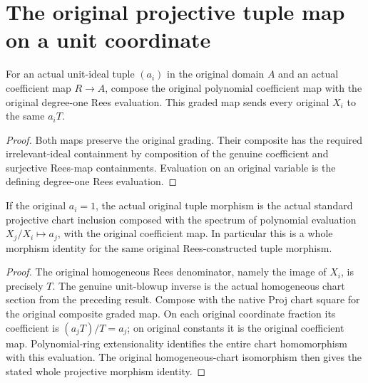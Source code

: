\section{The original projective tuple map on a unit coordinate}

\begin{definition}
\label{def:fc-generated-tuple-graded-map}
\leanok
{}
For an actual unit-ideal tuple $(a_i)$ in the original domain $A$ and
an actual coefficient map $R\to A$, compose the original polynomial
coefficient map with the original degree-one Rees evaluation. This
graded map sends every original $X_i$ to the same $a_iT$.
\end{definition}
\begin{proof}
Both maps preserve the original grading. Their composite has the
required irrelevant-ideal containment by composition of the genuine
coefficient and surjective Rees-map containments. Evaluation on an
original variable is the defining degree-one Rees evaluation.
\end{proof}

\begin{theorem}
\label{thm:fc-generated-tuple-unit-chart}
\leanok
{}
If the original $a_i=1$, the actual original tuple morphism is
the actual standard projective chart inclusion composed with the
spectrum of polynomial evaluation $X_j/X_i\mapsto a_j$, with the
original coefficient map. In particular this is a whole morphism
identity for the same original Rees-constructed tuple morphism.
\end{theorem}
\begin{proof}
The original homogeneous Rees denominator, namely the image of
$X_i$, is precisely $T$. The genuine unit-blowup inverse is the
actual homogeneous chart section from the preceding result. Compose
with the native Proj chart square for the original composite graded
map. On each original coordinate fraction its coefficient is
$(a_jT)/T=a_j$; on original constants it is the original coefficient
map. Polynomial-ring extensionality identifies the entire chart
homomorphism with this evaluation. The original homogeneous-chart
isomorphism then gives the stated whole projective morphism identity.
\end{proof}

